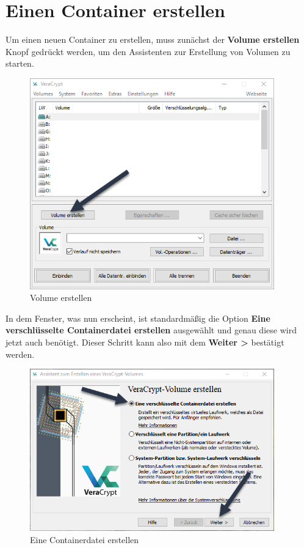 \documentclass[12pt,a4paper]{scrreprt}
\begin{document}
\newpage

\section{Einen Container erstellen}
Um einen neuen Container zu erstellen, muss zunächst der \textbf{Volume erstellen} Knopf gedrückt werden, um den Assistenten zur Erstellung von Volumen zu starten.

\begin{figure}[h]
\begin{center}
\includegraphics[width=300pt]{media/createvolumebutton.png}
\caption{Volume erstellen}
\label{createvol}
\end{center}
\end{figure}

\noindent In dem Fenster, was nun erscheint, ist standardmäßig die Option \textbf{Eine verschlüsselte Containerdatei erstellen} ausgewählt und genau diese wird jetzt auch benötigt. Dieser Schritt kann also mit dem \textbf{Weiter >} bestätigt werden.

\begin{figure}[h]
\begin{center}
\includegraphics[width=300pt]{media/createcontainer.png}
\caption{Eine Containerdatei erstellen}
\label{createcontainer}
\end{center}
\end{figure}
\end{document}
